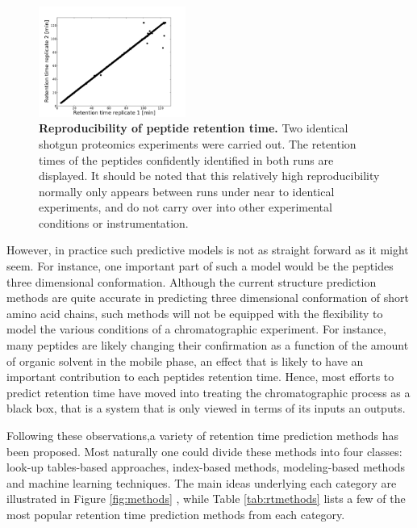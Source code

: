 \documentclass[a4paper]{article}
\begin{document}
\begin{figure}[htbp]
\centering
\includegraphics[trim=0.5cm 0cm 2cm 1.5cm, clip=true, width=0.43\textwidth]{img/reproducibility.pdf}
\caption{\label{fig:repr} {\bf Reproducibility of peptide retention
    time.} Two identical shotgun proteomics experiments were carried
  out. The retention times of the peptides confidently identified in
  both runs are displayed. It should be noted that this relatively high reproducibility normally only appears between runs under near to identical experiments, and do not carry over into other experimental conditions or instrumentation.}
\end{figure}

However, in practice such predictive models is not as straight forward
as it might seem. For instance, one important part of such a model
would be the peptides three dimensional conformation. Although the
current structure prediction methods are quite accurate in predicting
three dimensional conformation of short amino acid chains, such
methods will not be equipped with the flexibility to model the various
conditions of a chromatographic experiment. For instance, many
peptides are likely changing their confirmation as a function of the
amount of organic solvent in the mobile phase, an effect that is
likely to have an important contribution to each peptides retention
time. Hence, most efforts to predict retention time have moved into
treating the chromatographic process as a black box, that is a system
that is only viewed in terms of its inputs an outputs. 
 
  
Following these observations,a variety of retention time prediction methods has been proposed. Most naturally one could divide these
methods into four classes: look-up tables-based approaches,
index-based methods, modeling-based methods and machine learning
techniques. The main ideas underlying each category are illustrated in
Figure \ref{fig:methods} , while Table \ref{tab:rtmethods} lists a few
of the most popular retention time prediction methods from each
category.
\end{document}

